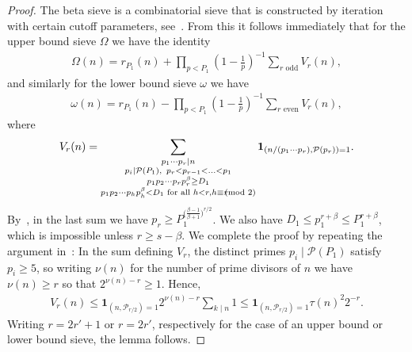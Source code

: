 \documentclass[12pt]{amsart}
\theoremstyle{definition}
\theoremstyle{remark}
\numberwithin{equation}{section}
\newcommand{\1}{\mathbf{1}}
\let\oldpmod\pmod
\renewcommand{\pmod}[1]{\hspace{-0.12cm}\oldpmod {#1}}
\begin{document}
	
\begin{proof}
The beta sieve is a combinatorial sieve that is constructed by iteration with certain cutoff parameters, see~\cite[equations (6.31)--(6.34), (6.54)]{cribro}.  From this it follows immediately that for the upper bound sieve $\Omega$ we have the identity
	\begin{align*}
	   \Omega(n)=r_{P_1}(n)+ \prod_{p < P_1}\left(1-\frac{1}{p}\right)^{-1}\sum_{r \text{ odd}}V_r(n),
	\end{align*}
	and similarly for the lower bound sieve $\omega$ we have
	\begin{align*}
	   \omega(n)=r_{P_1}(n)- \prod_{p < P_1}\left(1-\frac{1}{p}\right)^{-1}\sum_{r \text{ even}}V_r(n),
	\end{align*}
	where
	\begin{align*}
	   V_r(n)=\sum_{\substack{p_1\cdots p_r \mid n\\ p_i\mid \mathcal{P}(P_1), \,\,\, p_r<p_{r-1}<\ldots <p_1 \\ p_1p_2\cdots p_r p_r^\beta\geq D_1 \\ p_1p_2\cdots p_hp_h^{\beta} <D_1 \text{ for all } h<r, h\equiv r\pmod 2 }}\1_{(n/(p_1\cdots p_r),\mathcal{P}(p_r))=1}.
	\end{align*}
	By~\cite[Corollary 6.6]{cribro}, in the last sum we have $p_r\geq P_1^{\bigl(\frac{\beta-1}{\beta+1}\bigr)^{r/2}}$. We also have $D_1\leq p_1^{r+\beta}\leq P_1^{r+\beta}$, which is impossible unless $r\geq s-\beta$. We complete the proof by repeating the argument in~\cite[after equation (58)]{matoalmost}: In the sum defining $V_r$, the distinct primes $p_i\mid\mathcal{P}(P_1)$ satisfy $p_i\ge5$, so writing $\nu(n)$ for the number of prime divisors of $n$ we have $\nu(n)\geq r$ so that $2^{\nu(n)-r}\geq 1$. Hence,
    \begin{align*}
        V_r(n)\leq \1_{(n,\mathcal{P}_{r/2})=1} 2^{\nu(n)-r} \sum_{k \mid n} 1 \leq  \1_{(n,\mathcal{P}_{r/2})=1} \tau(n)^2 2^{-r}.
    \end{align*}
     Writing $r=2r'+1$ or $r=2r'$, respectively for the case of an upper bound or lower bound sieve, the lemma follows.
\end{proof}




	
\end{document}
